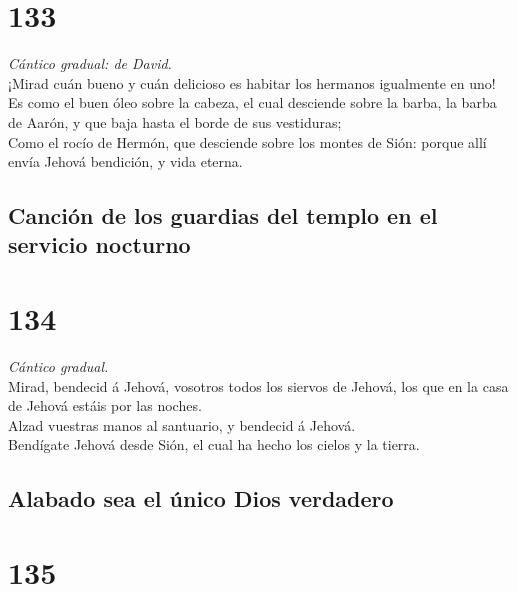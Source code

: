 \hypertarget{section-132}{%
\section{133}\label{section-132}}

 \emph{Cántico gradual: de David.}\\
¡Mirad cuán bueno y cuán delicioso es habitar los hermanos igualmente en
uno!\\
 Es como el buen óleo sobre la cabeza, el cual desciende
sobre la barba, la barba de Aarón, y que baja hasta el borde de sus
vestiduras;\\
 Como el rocío de Hermón, que desciende sobre los montes de
Sión: porque allí envía Jehová bendición, y vida eterna.

\hypertarget{canciuxf3n-de-los-guardias-del-templo-en-el-servicio-nocturno}{%
\subsection{Canción de los guardias del templo en el servicio
nocturno}\label{canciuxf3n-de-los-guardias-del-templo-en-el-servicio-nocturno}}

\hypertarget{section-133}{%
\section{134}\label{section-133}}

 \emph{Cántico gradual.}\\
Mirad, bendecid á Jehová, vosotros todos los siervos de Jehová, los que
en la casa de Jehová estáis por las noches.\\
 Alzad vuestras manos al santuario, y bendecid á Jehová.\\
 Bendígate Jehová desde Sión, el cual ha hecho los cielos y
la tierra.

\hypertarget{alabado-sea-el-uxfanico-dios-verdadero}{%
\subsection{Alabado sea el único Dios
verdadero}\label{alabado-sea-el-uxfanico-dios-verdadero}}

\hypertarget{section-134}{%
\section{135}\label{section-134}}

